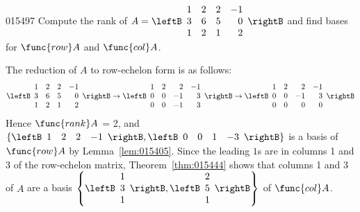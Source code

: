 \begin{example}{}{015497}
Compute the rank of 
$A = \leftB \begin{array}{rrrr}
1 & 2 & 2 & -1 \\
3 & 6 & 5 & 0 \\
1 & 2 & 1 & 2
\end{array} \rightB$ and find bases for $\func{row} A$ and $\func{col} A$.

\begin{solution}
  The reduction of $A$ to row-echelon form is as follows:
\begin{equation*}
\leftB \begin{array}{rrrr}
1 & 2 & 2 & -1 \\
3 & 6 & 5 & 0 \\
1 & 2 & 1 & 2
\end{array} \rightB
\rightarrow
\leftB \begin{array}{rrrr}
1 & 2 & 2 & -1 \\
0 & 0 & -1 & 3 \\
0 & 0 & -1 & 3
\end{array} \rightB
\rightarrow
\leftB \begin{array}{rrrr}
1 & 2 & 2 & -1 \\
0 & 0 & -1 & 3 \\
0 & 0 & 0 & 0
\end{array} \rightB
\end{equation*}
Hence $\func{rank} A$ = 2, and $ \{
\leftB \begin{array}{cccc}
1 & 2 & 2 & -1
\end{array} \rightB, 
\leftB \begin{array}{cccc}
0 & 0 & 1 & -3
\end{array} \rightB \}$
is a basis of $\func{row} A$ by Lemma~\ref{lem:015405}. Since the leading $1$s are in columns 1 and 3 of the row-echelon matrix, Theorem~\ref{thm:015444} shows that columns 1 and 3 of $A$ are a basis
$\left\{
\leftB \begin{array}{r}
1\\
3\\
1
\end{array} \rightB, \leftB \begin{array}{r}
2\\
5\\
1
\end{array} \rightB
\right\}$ of $\func{col} A$.
\end{solution}
\end{example}

